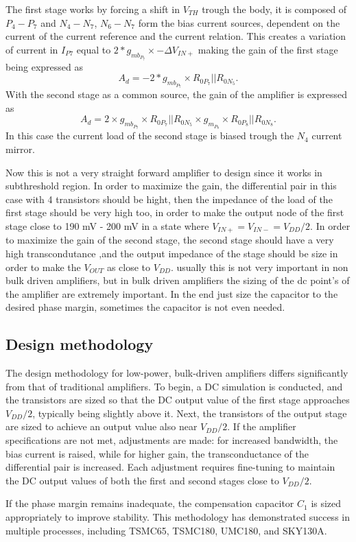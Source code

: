 \documentclass[12pt]{article}
\begin{document}
The first stage works by forcing a shift in $V_{TH}$ trough the body, it is composed of  $P_4-P_7$ and $N_4-N_7$, $N_6-N_7$ form the bias current sources, dependent on the current of the current reference and the current relation.
This creates a variation of current in  $I_{P7}$ equal to $2*g_{mb_{P_{7}}} \times -\Delta V_{IN+}$ making the gain of the first stage being expressed as 
\begin{equation}
    A_d= -2*g_{mb_{P_{7}}} \times R_{0P_7}|| R_{0N_5}.
\end{equation}
With the second stage as a common source, the gain of the amplifier is expressed as
\begin{equation}
    A_d= 2 \times g_{mb_{P_{7}}} \times R_{0P_7}|| R_{0N_5} \times  g_{m_{P_8}} \times R_{0P_8}|| R_{0N_8}.
\end{equation}
In this case the current load of the second stage is biased trough the $N_4$ current mirror.

Now this is not a very straight forward amplifier to design since it works in subthreshold region.
In order to maximize the gain, the differential pair in this case with 4 transistors should be hight, then the impedance of the load of the first stage should be very high too, in order to make the output node of the first stage close to 190 mV - 200 mV in a state where $V_{IN+} = V_{IN-} = V_{DD}/2$. In order to maximize the gain of the second stage, the second stage should have a very high transcondutance ,and the output impedance of the stage should be size in order to make the $V_{OUT}$ as close to $V_{DD}$. usually this is not very important in non bulk driven amplifiers, but in bulk driven amplifiers the sizing of the dc point's of the amplifier are extremely important. In the end just size the capacitor to the desired phase margin, sometimes the capacitor is not even needed.

\subsection{Design methodology}

The design methodology for low-power, bulk-driven amplifiers differs significantly from that of traditional amplifiers. To begin, a DC simulation is conducted, and the transistors are sized so that the DC output value of the first stage approaches \( V_{DD}/2 \), typically being slightly above it. Next, the transistors of the output stage are sized to achieve an output value also near \( V_{DD}/2 \). If the amplifier specifications are not met, adjustments are made: for increased bandwidth, the bias current is raised, while for higher gain, the transconductance of the differential pair is increased. Each adjustment requires fine-tuning to maintain the DC output values of both the first and second stages close to \( V_{DD}/2 \).

If the phase margin remains inadequate, the compensation capacitor \( C_1 \) is sized appropriately to improve stability. This methodology has demonstrated success in multiple processes, including TSMC65, TSMC180, UMC180, and SKY130A.
\end{document}
